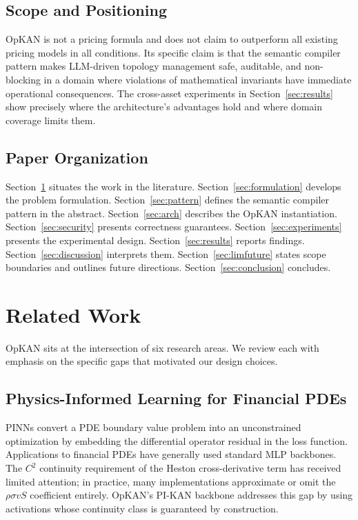 \documentclass[11pt,a4paper]{article}
\begin{document}
\subsection{Scope and Positioning}
\label{sec:scope}

OpKAN is not a pricing formula and does not claim to outperform all existing pricing
models in all conditions. Its specific claim is that the semantic compiler pattern
makes LLM-driven topology management safe, auditable, and non-blocking in a domain
where violations of mathematical invariants have immediate operational consequences.
The cross-asset experiments in Section~\ref{sec:results} show precisely where the
architecture's advantages hold and where domain coverage limits them.

\subsection{Paper Organization}

Section~\ref{sec:related} situates the work in the literature.
Section~\ref{sec:formulation} develops the problem formulation.
Section~\ref{sec:pattern} defines the semantic compiler pattern in the abstract.
Section~\ref{sec:arch} describes the OpKAN instantiation.
Section~\ref{sec:security} presents correctness guarantees.
Section~\ref{sec:experiments} presents the experimental design.
Section~\ref{sec:results} reports findings. Section~\ref{sec:discussion} interprets them.
Section~\ref{sec:limfuture} states scope boundaries and outlines future directions.
Section~\ref{sec:conclusion} concludes.

\section{Related Work}
\label{sec:related}

OpKAN sits at the intersection of six research areas. We review each with emphasis on
the specific gaps that motivated our design choices.

\subsection{Physics-Informed Learning for Financial PDEs}

PINNs \citep{raissi2019physics} convert a PDE boundary value problem into an
unconstrained optimization by embedding the differential operator residual in the loss
function. Applications to financial PDEs \citep{horvath2021deep} have generally used
standard MLP backbones. The $C^2$ continuity requirement of the Heston cross-derivative
term has received limited attention; in practice, many implementations approximate or
omit the $\rho\sigma vS$ coefficient entirely. OpKAN's PI-KAN backbone addresses this
gap by using activations whose continuity class is guaranteed by construction.
\end{document}
